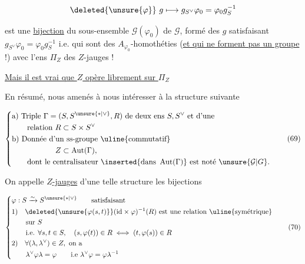 \[
\deleted{\unsure{\varphi}}\ g\longmapsto g_{S^\vee}\varphi_0=\varphi_0g_S^{-1}
\]

est une \uline{bijection} du  sous-ensemble $\mathcal G(\varphi_0)$ de $\mathcal G$, formé des $g$ satisfaisant $g_{S^\vee}\varphi_0=\varphi_0g_S^{-1}$ i.e. qui sont des $A_{\varphi_0}$-homothéties (\uline{et qui ne forment pas  un groupe} !) avec l'ens $\Pi_Z$ des $Z$-jauges !



\uline{Mais il est vrai que $Z$ opère librement sur $\Pi_Z$}

En résumé, nous  amenés à nous intéresser à la structure suivante

\[
\left\{\begin{aligned}
&\text{a) Triple }\Gamma=(S,S^{\unsure{*|\vee}},R)\ \text{de deux ens }S,S^\vee\ \text{et d'une}\\
&\qquad \text{relation }R\subset S\times S^\vee\\
&\text{b) Donnée d'un ss-groupe \uline{commutatif}}\\
&\hspace{20mm}Z\subset\operatorname{Aut}(\Gamma),\\
&\qquad\text{dont le centralisateur }\inserted{\text{dans }\operatorname{Aut}(\Gamma)}\ \text{est noté }\unsure{\mathcal G|G}.
\end{aligned}\right. \tag*{(69)}
\]


On appelle \uline{$Z$-jauges} d'une telle structure les  bijections

\[
\left\{\begin{aligned}
&\varphi:S\xrightarrow{\sim} S^{\unsure{*|\vee}}\qquad\text{satisfaisant}\\
&1)\quad\deleted{\unsure{\varphi(s,t)}}(\mathrm{id}\times\varphi)^{-1}(R)\ \text{est une relation \uline{symétrique}}\\
&\qquad\text{sur }S\\
&\qquad\text{i.e. }\forall s,t\in S,\quad(s,\varphi(t))\in R\iff(t,\varphi(s))\in R\\
&2)\quad\forall(\lambda,\lambda^\vee)\in Z,\ \text{on a}\\
&\qquad\lambda^\vee\varphi\lambda=\varphi\qquad\text{i.e }\lambda^\vee\varphi=\varphi\lambda^{-1}
\end{aligned}\right. \tag*{(70)}
\]

